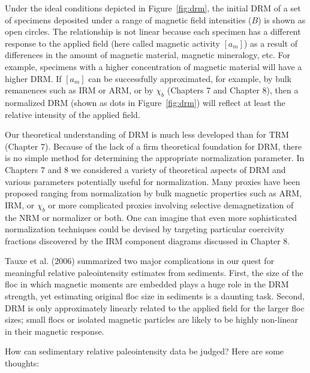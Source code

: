 Under the ideal conditions depicted in Figure~\ref{fig:drm}, the initial
DRM of a set of specimens deposited under a range of magnetic field
intensities ($B$) is shown as open circles.  The
relationship is not linear because each specimen has a different 
response   to the applied field (here called 
magnetic activity $[a_m]$) as a result of differences in
the amount of magnetic material, magnetic mineralogy, etc.
For example, specimens with a higher concentration of magnetic
material will have a higher DRM.  If $[a_m]$ can be successfully
approximated, for example, by bulk remanences such as IRM or ARM,
or by $\chi_b$ (Chapters  7 and Chapter 8), then a
normalized DRM (shown as dots in Figure~\ref{fig:drm}) will reflect at least  the
relative intensity of the applied field. 


Our theoretical understanding of DRM is much less developed than for TRM
(Chapter  7).  Because of the  lack of a firm theoretical foundation for
DRM, there is no simple method for determining  the appropriate normalization parameter.  In Chapters  7  and 8 we considered a variety of theoretical aspects of DRM and various parameters potentially useful for normalization.  Many proxies
have been proposed  ranging from normalization by bulk magnetic properties such as ARM, IRM, or  $\chi_b$ or more complicated proxies involving selective demagnetization of the NRM or normalizer or both.    One can imagine that even more sophisticated normalization techniques could be devised by targeting particular coercivity fractions discovered by the IRM component diagrams discussed in Chapter 8.  

Tauxe et al. (2006) \nocite{tauxe06} summarized two major complications in our quest for meaningful relative paleointensity estimates from sediments.  First, the size of the floc in which magnetic moments are embedded plays a huge role in the DRM strength, yet estimating original floc size in sediments is a daunting task.  Second, DRM is only approximately linearly related to the applied field for the larger floc sizes;  small flocs or isolated magnetic particles are likely to be highly non-linear in their magnetic response.  

How can sedimentary relative paleointensity data be judged?  Here  are some thoughts:


